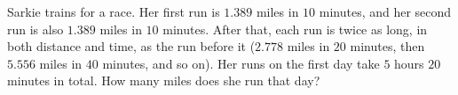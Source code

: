 Sarkie trains for a race. Her first run is $1.389$ miles in $10$ minutes, and her second run is also $1.389$ miles in $10$ minutes. After that, each run is twice as long, in both distance and time, as the run before it ($2.778$ miles in $20$ minutes, then $5.556$ miles in $40$ minutes, and so on). Her runs on the first day take $5$ hours $20$ minutes in total. How many miles does she run that day?
